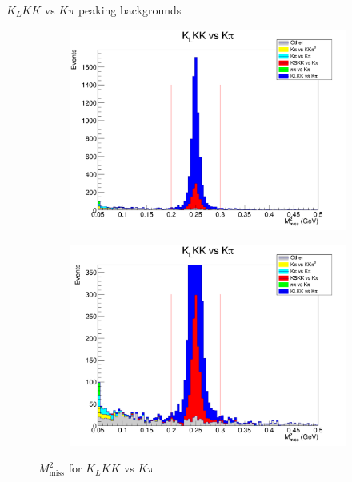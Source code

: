 \documentclass{beamer}
\begin{document}
\begin{frame}{$K_LKK$ vs $K\pi$ peaking backgrounds}
  \begin{figure}
    \centering
    \begin{subfigure}{0.5\textwidth}
      \centering
      \includegraphics[width=\textwidth]{KLKKVersusKpiPeaking.png}
    \end{subfigure}%
    \begin{subfigure}{0.5\textwidth}
      \centering
      \includegraphics[width=\textwidth]{KLKKVersusKpiPeaking2.png}
    \end{subfigure}
    \caption{$M^2_\text{miss}$ for $K_LKK$ vs $K\pi$}
  \end{figure}
\end{frame}
\end{document}
